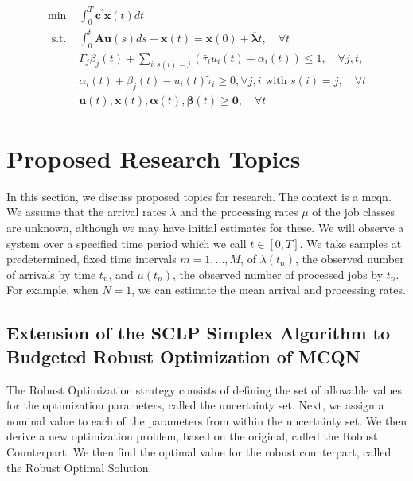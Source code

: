 \documentclass[11pt,a4paper,titlepage]{article}
\theoremstyle{definition}
\theoremstyle{plain}
\begin{document}
\begin{align}
\begin{split}
    \label{eq:mcqn-robust-counterpart}
    \min & \int_{0}^{T} \mathbf{c}^{\prime} \mathbf{x}(t) d t \\
    \text { s.t. } & \int_{0}^{t} \mathbf{A} \mathbf{u}(s) d s+\mathbf{x}(t)=\mathbf{x}(0)+\overline{\boldsymbol{\lambda}} t, \quad \forall t \\
    & \Gamma_{j} \beta_{j}(t)+\sum_{i: s(i)=j}\left(\bar{\tau}_{i} u_{i}(t)+\alpha_{i}(t)\right) \leq 1, \quad \forall j, t, \\
    & \alpha_{i}(t)+\beta_{j}(t)-u_{i}(t) \tilde{\tau}_{i} \geq 0, \forall j, i \text { with } s(i)=j, \quad \forall t \\
    & \mathbf{u}(t), \mathbf{x}(t), \boldsymbol{\alpha}(t), \boldsymbol{\beta}(t) \geq \mathbf{0}, \quad \forall t
\end{split}
\end{align}


\section{Proposed Research Topics}
\label{sec:topics}

In this section,
we discuss proposed topics for research.
The context is a \gls{mcqn}.
We assume that the arrival rates $\lambda$
and the processing rates $\mu$ of the job classes are unknown,
although we may have initial estimates for these.
We will observe a system over a specified time period which we call $t \in [0,T]$.
We take samples at predetermined,
fixed time intervals $m=1,\ldots,M$,
of $\lambda(t_n)$,
the observed number of arrivals by time $t_n$,
and $\mu(t_n)$,
the observed number of processed jobs by $t_n$.
For example,
when $N=1$,
we can estimate the mean arrival and processing rates.

\subsection{Extension of the SCLP Simplex Algorithm to Budgeted Robust Optimization of MCQN}
\label{subsec:topics:robust-sclp-extension}

The Robust Optimization strategy consists of defining the set of allowable
values for the optimization parameters,
called the uncertainty set.
Next,
we assign a nominal value to each of the parameters from within the uncertainty set.
We then derive a new optimization problem,
based on the original,
called the Robust Counterpart.
We then find the optimal value for the robust counterpart,
called the Robust Optimal Solution.
\end{document}
